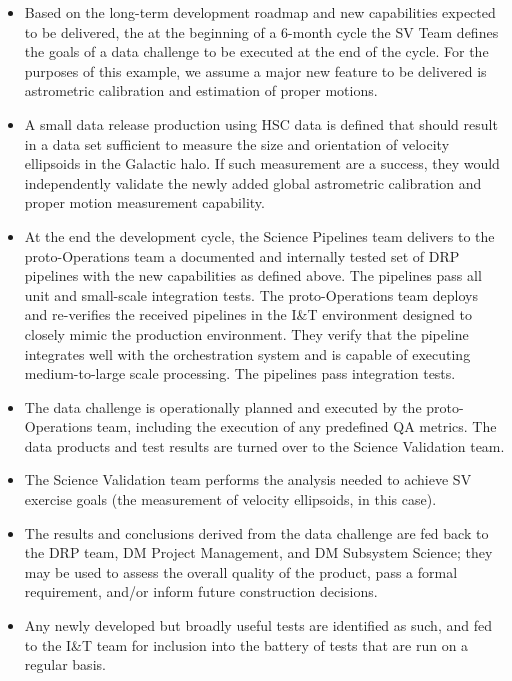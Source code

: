 \begin{itemize}

\item Based on the long-term development roadmap and new capabilities
expected to be delivered, the at the beginning of a 6-month cycle the SV
Team defines the goals of a data challenge to be executed at the end of the
cycle.  For the purposes of this example, we assume a major new feature to
be delivered is astrometric calibration and estimation of proper motions.

\item A small data release production using HSC data is defined that
should result in a data set sufficient to measure the size and orientation
of velocity ellipsoids in the Galactic halo.  If such measurement are a
success, they would independently validate the newly added global
astrometric calibration and proper motion measurement capability.

\item At the end the development cycle, the Science Pipelines team delivers to the
proto-Operations team a documented and internally tested set of DRP
pipelines with the new capabilities as defined above.  The pipelines pass
all unit and small-scale integration tests.  The proto-Operations team
deploys and re-verifies the received pipelines in the I\&T environment
designed to closely mimic the production environment.  They verify that the
pipeline integrates well with the orchestration system and is capable of
executing medium-to-large scale processing.  The pipelines pass integration
tests.

\item The data challenge is operationally planned and executed by the
proto-Operations team, including the execution of any predefined QA metrics.
The data products and test results are turned over to the Science
Validation team.

\item The Science Validation team performs the analysis needed to achieve
SV exercise goals (the measurement of velocity ellipsoids, in this case).

\item The results and conclusions derived from the data challenge are fed back to
the DRP team, DM Project Management, and DM Subsystem Science; they may be
used to assess the overall quality of the product, pass a formal
requirement, and/or inform future construction decisions.

\item Any newly developed but broadly useful tests are identified as such,
and fed to the I\&T team for inclusion into the battery of tests that are
run on a regular basis.

\end{itemize}
